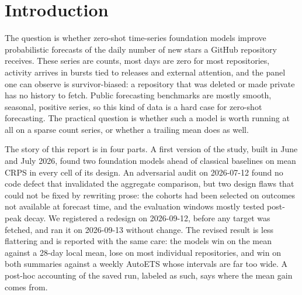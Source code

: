 \section{Introduction}

The question is whether zero-shot time-series foundation models improve probabilistic forecasts of the daily
number of new stars a GitHub repository receives. These series are counts, most days are zero for most
repositories, activity arrives in bursts tied to releases and external attention, and the panel one can
observe is survivor-biased: a repository that was deleted or made private has no history to fetch. Public
forecasting benchmarks are mostly smooth, seasonal, positive series, so this kind of data is a hard case for
zero-shot forecasting. The practical question is whether such a model is worth running at all on a sparse
count series, or whether a trailing mean does as well.

The story of this report is in four parts. A first version of the study, built in June and July 2026, found
two foundation models ahead of classical baselines on mean CRPS in every cell of its design. An adversarial
audit on 2026-07-12 found no code defect that invalidated the aggregate comparison, but two design flaws that
could not be fixed by rewriting prose: the cohorts had been selected on outcomes not available at forecast
time, and the evaluation windows mostly tested post-peak decay. We registered a redesign on 2026-09-12, before
any target was fetched, and ran it on 2026-09-13 without change. The revised result is less flattering and is
reported with the same care: the models win on the mean against a 28-day local mean, lose on most individual
repositories, and win on both summaries against a weekly AutoETS whose intervals are far too wide. A post-hoc
accounting of the saved run, labeled as such, says where the mean gain comes from.

